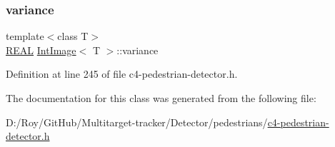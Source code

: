 \mbox{\label{class_int_image_a2da0267dc732e9e4149e70a05f744fb6}} 
\subsubsection{\texorpdfstring{variance}{variance}}
{\footnotesize\ttfamily template$<$class T$>$ \\
\mbox{\hyperlink{c4-pedestrian-detector_8h_a5821460e95a0800cf9f24c38915cbbde}{R\+E\+AL}} \mbox{\hyperlink{class_int_image}{Int\+Image}}$<$ T $>$\+::variance}



Definition at line 245 of file c4-\/pedestrian-\/detector.\+h.



The documentation for this class was generated from the following file\+:\begin{DoxyCompactItemize}
\item 
D\+:/\+Roy/\+Git\+Hub/\+Multitarget-\/tracker/\+Detector/pedestrians/\mbox{\hyperlink{c4-pedestrian-detector_8h}{c4-\/pedestrian-\/detector.\+h}}\end{DoxyCompactItemize}

